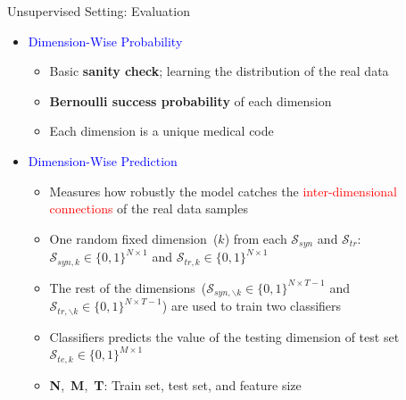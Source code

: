 \documentclass{beamer}
\begin{document}
\begin{frame}{Unsupervised Setting: Evaluation}

\begin{itemize}
    \item \textcolor{blue}{Dimension-Wise Probability}
    \begin{itemize}
        \item Basic \textbf{sanity check}; learning the distribution of the real data
        \item \textbf{Bernoulli success probability} of each dimension 
        \item Each dimension is a unique medical code
    \end{itemize}
    
    
    \item \textcolor{blue}{Dimension-Wise Prediction}
    \begin{itemize}
        \item Measures how robustly the model catches the \textcolor{red}{inter-dimensional connections} of the real data samples
        \item One random fixed dimension~($k$) from each $\mathcal{S}_{syn}$ and $\mathcal{S}_{tr}$: $\mathcal{S}_{syn,k} \in \{0,1\}^{N \times 1}$ and $\mathcal{S}_{tr,k} \in \{0,1\}^{N \times 1}$
        \item The rest of the dimensions~($\mathcal{S}_{syn, \backslash k} \in \{0,1\}^{N \times T-1}$ and $\mathcal{S}_{tr, \backslash k} \in \{0,1\}^{N \times T-1}$) are used to train two classifiers
        \item Classifiers predicts the value of the testing dimension of test set $\mathcal{S}_{te,k} \in \{0,1\}^{M \times 1}$
        \item \textbf{N},~\textbf{M},~\textbf{T}: Train set, test set, and feature size
    \end{itemize}
\end{itemize}


\end{frame}
\end{document}
